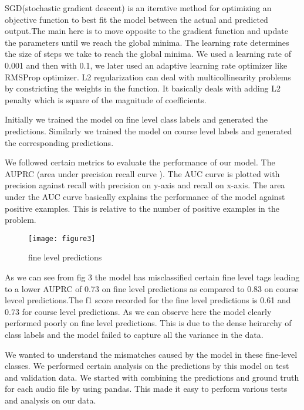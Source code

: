     SGD(stochastic gradient descent) is an iterative method for optimizing an objective function to best fit the model between the actual and predicted output.The main here is to move opposite to the gradient function and update the parameters until we reach the global minima. The learning rate determines the size of steps we take to reach the global minima. We used a learning rate of 0.001 and then with 0.1, we later used an adaptive learning rate optimizer like RMSProp optimizer.
    L2 regularization can deal with multicollinearity problems by constricting the weights in the function. It basically deals with adding L2 penalty which is square of the magnitude of coefficients.
    
    Initially we trained the model on fine level class labels and generated the predictions. Similarly we trained the model on course level labels and generated the corresponding predictions. 
    
    We followed certain metrics to evaluate the performance of our model. The AUPRC (area under precision recall curve ). The AUC curve is plotted with precision against recall with precision on y-axis and recall on x-axis. The area under the AUC curve basically explains the performance of the model against positive examples. This is relative to the number of positive examples in the problem.
    	\begin{figure}[h!]
    	\texttt{[image: figure3]}
    	\caption{fine level predictions}
    \end{figure}
   
    
    As we can see from fig 3 the model has misclassified certain fine level tags leading to a lower AUPRC of 0.73 on fine level predictions as compared to 0.83 on course levcel predictions.The f1 score recorded for the fine level predictions is 0.61 and 0.73 for course level predictions. As we can observe here the model clearly performed poorly on fine level predictions. This is due to the dense heirarchy of class labels and the model failed to capture all the variance in the data.
    
    We wanted to understand the mismatches caused by the model in these fine-level classes. We performed certain analysis on the predictions by this model on test and validation data. We started with combining the predictions and ground truth for each audio file by using pandas. This made it easy to perform various tests and analysis on our data.
    
   

	
	
